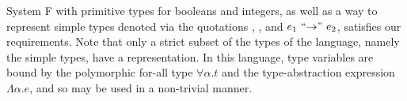 \begin{ex}[System F]
  \label{ex:system-f}
  System F with primitive types for booleans and integers, as well as a way to represent simple types denoted via the quotations \say{\Int}, \say{\Bool}, and $e_1 ~\text{``\ensuremath{\to}''}~ e_2$, satisfies our requirements.
  Note that only a strict subset of the types of the language, namely the simple types, have a representation.
  In this language, type variables are bound by the polymorphic for-all type $\forall \alpha.t$ and the type-abstraction expression $\Lambda \alpha.e$, and so may be used in a non-trivial manner.
  \begin{syntax}
  	 \alternative{\alpha} \alternative{\Int} \alternative{\Bool} \alternative{\Typ}\\
  	 
         \\
     \\
    \alternative{\True} \alternative{\False} \\
    \alternative{\say{\Int}} \alternative{\say{\Bool}} 
  \end{syntax}
\end{ex}

